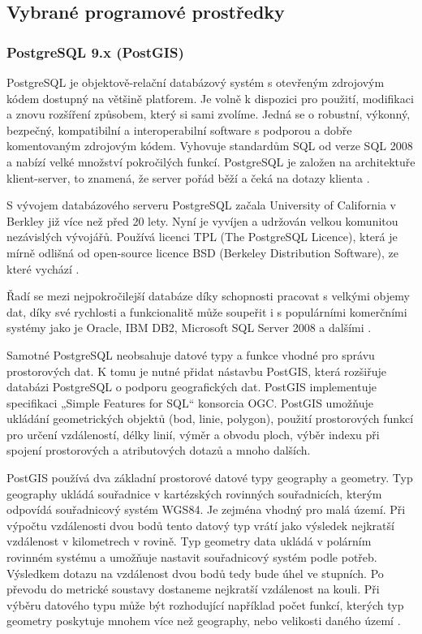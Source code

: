 \subsection{Vybrané programové prostředky}
\label{kPouziteProstredky}

\subsubsection{PostgreSQL 9.x (PostGIS)}
        \label{PostgreSQL}

PostgreSQL je objektově-relační databázový systém s otevřeným zdrojovým kódem dostupný na většině platforem. Je volně k dispozici pro použití, modifikaci a znovu rozšíření způsobem, který si sami zvolíme. Jedná se o robustní, výkonný, bezpečný, kompatibilní a interoperabilní software s podporou a dobře komentovaným zdrojovým kódem. Vyhovuje standardům SQL od verze SQL 2008 a nabízí velké množství pokročilých funkcí. PostgreSQL je založen na architektuře klient-server, to znamená, že server pořád běží a čeká na dotazy klienta \citep{Momjian2001}. 

S vývojem databázového serveru PostgreSQL začala University of California v Berkley již více než před 20 lety. Nyní je vyvíjen a udržován velkou komunitou nezávislých vývojářů. Používá licenci TPL (The PostgreSQL Licence), která je mírně odlišná od open-source licence BSD (Berkeley Distribution Software), ze které vychází \citep{RiggsKrossing2010}.

Řadí se mezi nejpokročilejší databáze díky schopnosti pracovat s velkými objemy dat, díky své rychlosti a funkcionalitě může soupeřit i s populárními komerčními systémy jako je Oracle, IBM DB2, Microsoft SQL Server 2008 a dalšími \citep{PostgreSQL2012}.

Samotné PostgreSQL neobsahuje datové typy a funkce vhodné pro správu prostorových dat. K tomu je nutné přidat nástavbu PostGIS, která rozšiřuje databázi PostgreSQL o podporu geografických dat. PostGIS implementuje specifikaci „Simple Features for SQL“ konsorcia OGC. PostGIS umožňuje ukládání geometrických objektů (bod, linie, polygon), použití prostorových funkcí pro určení vzdáleností, délky linií, výměr a obvodu ploch, výběr indexu při spojení prostorových a atributových dotazů a mnoho dalších.

PostGIS používá dva základní prostorové datové typy geography a geometry. Typ geography ukládá souřadnice v kartézských rovinných souřadnicích, kterým odpovídá souřadnicový systém WGS84. Je zejména vhodný pro malá území. Při výpočtu vzdálenosti dvou bodů tento datový typ vrátí jako výsledek nejkratší vzdálenost v kilometrech v rovině. Typ geometry data ukládá v polárním rovinném systému a umožňuje nastavit souřadnicový systém podle potřeb. Výsledkem dotazu na vzdálenost dvou bodů tedy bude úhel ve stupních. Po převodu do metrické soustavy dostaneme nejkratší vzdálenost na kouli. Při výběru datového typu může být rozhodující například počet funkcí, kterých typ geometry poskytuje mnohem více než geography, nebo velikosti daného území \citep{OpenGeo2012}.

